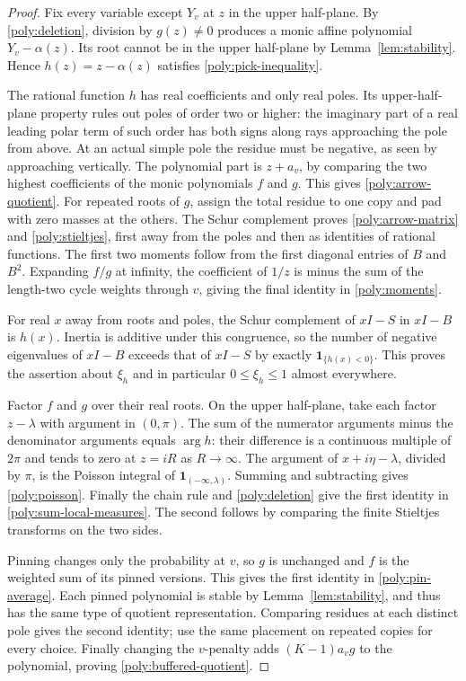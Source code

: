 \begin{proof}
Fix every variable except $Y_v$ at $z$ in the upper half-plane. By
\eqref{poly:deletion}, division by $g(z)\ne0$ produces a monic affine
polynomial $Y_v-\alpha(z)$. Its root cannot be in the upper half-plane by
Lemma~\ref{lem:stability}. Hence
$h(z)=z-\alpha(z)$ satisfies \eqref{poly:pick-inequality}.

The rational function $h$ has real coefficients and only real poles.
Its upper-half-plane property rules out poles of order two or higher:
the imaginary part of a real leading polar term of such order has both
signs along rays approaching the pole from above. At an actual simple
pole the residue must be negative, as seen by approaching vertically.
The polynomial part is $z+a_v$, by comparing the two highest coefficients
of the monic polynomials $f$ and $g$. This gives
\eqref{poly:arrow-quotient}. For repeated roots of $g$, assign the total
residue to one copy and pad with zero masses at the others. The Schur
complement proves \eqref{poly:arrow-matrix} and
\eqref{poly:stieltjes}, first away from the poles and then as identities
of rational functions. The first two moments follow from the first
diagonal entries of $B$ and $B^2$. Expanding $f/g$ at infinity, the
coefficient of $1/z$ is minus the sum of the length-two cycle weights
through $v$, giving the final identity in \eqref{poly:moments}.

For real $x$ away from roots and poles, the Schur complement of $xI-S$
in $xI-B$ is $h(x)$. Inertia is additive under this congruence, so the
number of negative eigenvalues of $xI-B$ exceeds that of $xI-S$ by
exactly $\mathbf1_{\{h(x)<0\}}$. This proves the assertion about
$\xi_h$ and in particular $0\leq\xi_h\leq1$ almost everywhere.

Factor $f$ and $g$ over their real roots. On the upper half-plane, take
each factor $z-\lambda$ with argument in $(0,\pi)$. The sum of the
numerator arguments minus the denominator arguments equals $\arg h$:
their difference is a continuous multiple of $2\pi$ and tends to zero
at $z=iR$ as $R\to\infty$. The argument of $x+i\eta-\lambda$, divided
by $\pi$, is the Poisson integral of
$\mathbf1_{(-\infty,\lambda)}$. Summing and subtracting gives
\eqref{poly:poisson}. Finally the chain rule and
\eqref{poly:deletion} give the first identity in
\eqref{poly:sum-local-measures}. The second follows by comparing the
finite Stieltjes transforms on the two sides.

Pinning changes only the probability at $v$, so $g$ is unchanged and
$f$ is the weighted sum of its pinned versions. This gives the first
identity in \eqref{poly:pin-average}. Each pinned polynomial is stable
by Lemma~\ref{lem:stability}, and thus has the same type of quotient
representation. Comparing residues at each distinct pole gives the
second identity; use the same placement on repeated copies for every
choice. Finally changing the $v$-penalty adds $(K-1)a_v g$ to the
polynomial, proving \eqref{poly:buffered-quotient}.
\end{proof}

